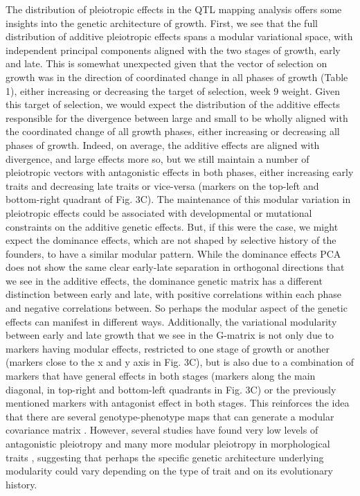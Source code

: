 \begin{refsection}
The distribution of pleiotropic effects in the QTL mapping analysis
offers some insights into the genetic architecture of growth. First, we
see that the full distribution of additive pleiotropic effects spans a
modular variational space, with independent principal components aligned
with the two stages of growth, early and late. This is somewhat
unexpected given that the vector of selection on growth was in the
direction of coordinated change in all phases of growth (Table 1),
either increasing or decreasing the target of selection, week 9 weight.
Given this target of selection, we would expect the distribution of the
additive effects responsible for the divergence between large and small
to be wholly aligned with the coordinated change of all growth phases,
either increasing or decreasing all phases of growth. Indeed, on
average, the additive effects are aligned with divergence, and large
effects more so, but we still maintain a number of pleiotropic vectors
with antagonistic effects in both phases, either increasing early traits
and decreasing late traits or vice-versa (markers on the top-left and
bottom-right quadrant of Fig. 3C). The maintenance of this modular
variation in pleiotropic effects could be associated with developmental
or mutational constraints on the additive genetic effects. But, if this
were the case, we might expect the dominance effects, which are not
shaped by selective history of the founders, to have a similar modular
pattern. While the dominance effects PCA does not show the same clear
early-late separation in orthogonal directions that we see in the
additive effects, the dominance genetic matrix has a different
distinction between early and late, with positive correlations within
each phase and negative correlations between. So perhaps the modular
aspect of the genetic effects can manifest in different ways.
Additionally, the variational modularity between early and late growth
that we see in the G-matrix is not only due to markers having modular
effects, restricted to one stage of growth or another (markers close to
the x and y axis in Fig. 3C), but is also due to a combination of
markers that have general effects in both stages (markers along the main
diagonal, in top-right and bottom-left quadrants in Fig. 3C) or the
previously mentioned markers with antagonist effect in both stages. This
reinforces the idea that there are several genotype-phenotype maps that
can generate a modular covariance matrix \parencite{Pavlicev2011-xm}.
However, several studies have found very low levels of antagonistic
pleiotropy and many more modular pleiotropy in morphological traits
\parencite{Leamy1999-dm,Leamy2002-nh,Kenney-Hunt2008-bd}, suggesting that perhaps
the specific genetic architecture underlying modularity could vary
depending on the type of trait and on its evolutionary history.


\end{refsection}

